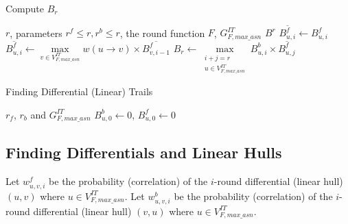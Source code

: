 \begin{algorithm}
	\caption{Compute $B_r$}
	\label{algo2}
	\begin{algorithmic}[1] %
		\Require $r$, parameters $r^f\leq r,r^b\leq r$, the round function $F$, $G^{IT}_{F,max\_asn}$
		\Ensure $B^r$
		\State $\overline{B^f_{u,i}}\leftarrow B^f_{u,i}$
		\EndFor
		\State $\overline{B^f_{u,i}}\leftarrow\max\limits_{v\in V^{IT}_{F,max\_asn}} w(u\rightarrow v)\times\overline{B^f_{v,i-1}}$
		\EndFor
		\State $B_r\leftarrow\max\limits_{\substack{i+j=r\\u\in V^{IT}_{F,max\_asn}}} B^b_{u,i}\times \overline{B^f_{u,j}}$
		\EndProcedure
	\end{algorithmic}
\end{algorithm}




\begin{algorithm}
	\caption{Finding Differential (Linear) Trails}
	\label{algo1}
	\begin{algorithmic}[1] %
		\Require $r_f$, $r_b$ and $G^{IT}_{F,max\_asn}$
		\Ensure 
		\State $B^b_{u,0}\leftarrow 0$, $B^f_{u,0}\leftarrow 0$
		\EndFor
		\EndProcedure
		

		\EndProcedure
	\end{algorithmic}
\end{algorithm}

\subsection{Finding Differentials and Linear Hulls}

Let $w^f_{u,v,i}$ be the probability (correlation) of the $i$-round differential (linear hull) $(u,v)$ where $u\in V^{IT}_{F,max\_asn}$. Let $w^b_{u,v,i}$ be the probability (correlation) of the $i$-round differential (linear hull) $(v,u)$ where $u\in V^{IT}_{F,max\_asn}$. 



